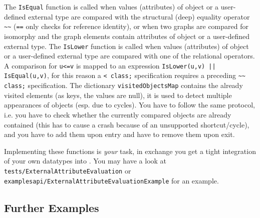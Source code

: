 The \texttt{IsEqual} function is called when values (attributes) of object or a user-defined external type are compared with the structural (deep) equality operator \texttt{\textasciitilde\textasciitilde} (\texttt{==} only checks for reference identity),
or when two graphs are compared for isomorphy and the graph elements contain attributes of object or a user-defined external type.
The \texttt{IsLower} function is called when values (attributes) of object or a user-defined external type are compared with one of the relational operators.
A comparison for \texttt{u<=v} is mapped to an expression \verb#IsLower(u,v) || IsEqual(u,v)#, for this reason a \verb#< class;# specification requires a preceding \verb#~~ class;# specification.
The dictionary \texttt{visitedObjectsMap} contains the already visited elements (as keys, the values are null), it is used to detect multiple appearances of objects (esp. due to cycles).
You have to follow the same protocol, i.e. you have to check whether the currently compared objects are already contained (this has to cause a crash because of an unsupported shortcut/cycle), and you have to add them upon entry and have to remove them upon exit.

Implementing these functions is \emph{your} task, in exchange you get a tight integration of your own datatypes into \GrG.
You may have a look at \texttt{tests/External\-Attribute\-Evaluation} or \texttt{examples\-api/External\-Attribute\-Evaluation\-Example} for an example.

\subsection*{Further Examples}


